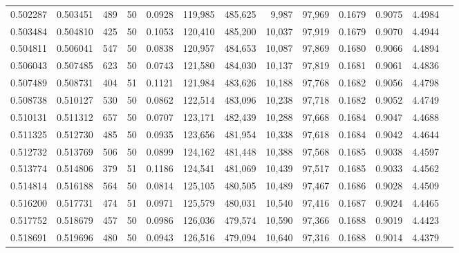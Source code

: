 \begin{tabular}{rrrrrrrrrrrrr}
0.502287 & 0.503451 &   489 &  50 &                                     0.0928 & 119,985 & 485,625 &   9,987 &  97,969 & 0.1679 & 0.9075 & 4.4984 \\
0.503484 & 0.504810 &   425 &  50 &                                     0.1053 & 120,410 & 485,200 &  10,037 &  97,919 & 0.1679 & 0.9070 & 4.4944 \\
0.504811 & 0.506041 &   547 &  50 &                                     0.0838 & 120,957 & 484,653 &  10,087 &  97,869 & 0.1680 & 0.9066 & 4.4894 \\
0.506043 & 0.507485 &   623 &  50 &                                     0.0743 & 121,580 & 484,030 &  10,137 &  97,819 & 0.1681 & 0.9061 & 4.4836 \\
0.507489 & 0.508731 &   404 &  51 &                                     0.1121 & 121,984 & 483,626 &  10,188 &  97,768 & 0.1682 & 0.9056 & 4.4798 \\
0.508738 & 0.510127 &   530 &  50 &                                     0.0862 & 122,514 & 483,096 &  10,238 &  97,718 & 0.1682 & 0.9052 & 4.4749 \\
0.510131 & 0.511312 &   657 &  50 &                                     0.0707 & 123,171 & 482,439 &  10,288 &  97,668 & 0.1684 & 0.9047 & 4.4688 \\
0.511325 & 0.512730 &   485 &  50 &                                     0.0935 & 123,656 & 481,954 &  10,338 &  97,618 & 0.1684 & 0.9042 & 4.4644 \\
0.512732 & 0.513769 &   506 &  50 &                                     0.0899 & 124,162 & 481,448 &  10,388 &  97,568 & 0.1685 & 0.9038 & 4.4597 \\
0.513774 & 0.514806 &   379 &  51 &                                     0.1186 & 124,541 & 481,069 &  10,439 &  97,517 & 0.1685 & 0.9033 & 4.4562 \\
0.514814 & 0.516188 &   564 &  50 &                                     0.0814 & 125,105 & 480,505 &  10,489 &  97,467 & 0.1686 & 0.9028 & 4.4509 \\
0.516200 & 0.517731 &   474 &  51 &                                     0.0971 & 125,579 & 480,031 &  10,540 &  97,416 & 0.1687 & 0.9024 & 4.4465 \\
0.517752 & 0.518679 &   457 &  50 &                                     0.0986 & 126,036 & 479,574 &  10,590 &  97,366 & 0.1688 & 0.9019 & 4.4423 \\
0.518691 & 0.519696 &   480 &  50 &                                     0.0943 & 126,516 & 479,094 &  10,640 &  97,316 & 0.1688 & 0.9014 & 4.4379 \\

\end{tabular}
